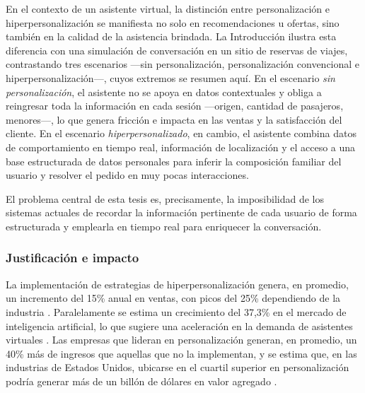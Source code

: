 En el contexto de un asistente virtual, la distinción entre personalización e hiperpersonalización se manifiesta no solo en recomendaciones u ofertas, sino también en la calidad de la asistencia brindada. La Introducción ilustra esta diferencia con una simulación de conversación en un sitio de reservas de viajes, contrastando tres escenarios —sin personalización, personalización convencional e hiperpersonalización—, cuyos extremos se resumen aquí. En el escenario \emph{sin personalización}, el asistente no se apoya en datos contextuales y obliga a reingresar toda la información en cada sesión —origen, cantidad de pasajeros, menores—, lo que genera fricción e impacta en las ventas y la satisfacción del cliente. En el escenario \emph{hiperpersonalizado}, en cambio, el asistente combina datos de comportamiento en tiempo real, información de localización y el acceso a una base estructurada de datos personales para inferir la composición familiar del usuario y resolver el pedido en muy pocas interacciones.

El problema central de esta tesis es, precisamente, la imposibilidad de los sistemas actuales de recordar la información pertinente de cada usuario de forma estructurada y emplearla en tiempo real para enriquecer la conversación.

\subsubsection{Justificación e impacto}

La implementación de estrategias de hiperpersonalización genera, en promedio, un incremento del 15\% anual en ventas, con picos del 25\% dependiendo de la industria \parencite{McKinsey2021}. Paralelamente se estima un crecimiento del 37,3\% en el mercado de inteligencia artificial, lo que sugiere una aceleración en la demanda de asistentes virtuales \parencite{GrandViewResearch2023}. Las empresas que lideran en personalización generan, en promedio, un 40\% más de ingresos que aquellas que no la implementan, y se estima que, en las industrias de Estados Unidos, ubicarse en el cuartil superior en personalización podría generar más de un billón de dólares en valor agregado \parencite{McKinsey2021}.

